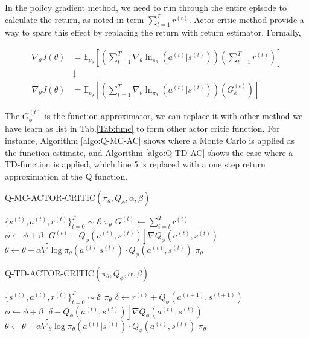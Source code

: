 \documentclass[11pt]{article}
\begin{document}
In the policy gradient method, we need to run through the entire episode to calculate the return, as noted in term $\sum_{t=1}^{T}r^{(t)}$. Actor critic method provide a way to spare this effect by replacing the return with return estimator. Formally, 

\begin{align*}
    \nabla_\theta  J(\theta)&=\mathbb{E}_{p_\theta} \left[\left(\sum_{t=1}^{T}\nabla_{\theta}\ln_{\pi_ \theta}(a^{(t)}|s^{(t)})\right)\left( \sum_{t=1}^{T}r^{(t)}\right)\right] \\
    &\downarrow \\
    \nabla_\theta  J(\theta)&=\mathbb{E}_{p_\theta} \left[\left(\sum_{t=1}^{T}\nabla_{\theta}\ln_{\pi_ \theta}(a^{(t)}|s^{(t)})\right)\left( G_{\phi}^{(t)}\right)\right] 
\end{align*}

The $G_{\phi}^{(t)}$ is the function approximator, we can replace it with other method we have learn as list in Tab.\ref{Tab:func} to form other actor critic function. For instance, Algorithm \ref{algo:Q-MC-AC} shows where a Monte Carlo is applied as the function estimate, and Algorithm \ref{algo:Q-TD-AC} shows the case where a TD-function is applied, which line 5 is replaced with a one step return approximation of the Q function.


\begin{algorithm}[H]
\caption{Q-MC-ACTOR-CRITIC$( \pi_\theta , Q_\phi , \alpha , \beta)$}
\label{algo:Q-MC-AC}
\begin{algorithmic}[1]
\STATE $\{s^{(t)},a^{(t)},r^{(t)}\}_{t=0}^{T} \sim \mathcal{E}| \pi_\theta $
\STATE $G^{(t)} \leftarrow \sum_{i=t}^{T} r^{(i)}$
\STATE $\phi \leftarrow \phi  +  \beta[ G^{(t)}-Q_\phi(a^{(t)} , s^ {( t )})]\nabla Q_\phi(a^{(t)} , s^{(t)})$
\STATE $\theta \leftarrow \theta + \alpha \nabla \log{\pi_\theta(a^{(t)}|s^{(t)})} \cdot Q_\phi(a^{(t)},s^{(t)}) $
\ENDFOR
\ENDFOR 
\RETURN $\pi_\theta$
\end{algorithmic}
\end{algorithm}


\begin{algorithm}[H]
\caption{Q-TD-ACTOR-CRITIC$( \pi_\theta , Q_\phi, \alpha, \beta)$}
\label{algo:Q-TD-AC}
\begin{algorithmic}[1]
\STATE $ \{s^{(t)},a^{(t)},r^{(t)}\}_{t=0}^T  \sim \mathcal{E}| \pi_\theta $
\STATE $ \delta  \leftarrow  r^{(t)} + Q_\phi( a^{(t+1)}, s^{(t+1)}) $
\STATE $ \phi  \leftarrow \phi + \beta[\delta-Q_\phi(a^{(t)},s^{(t)})]\nabla  Q_\phi(a^{(t)} , s^{(t)}) $
\STATE $ \theta \leftarrow \theta + \alpha \nabla_{ \theta } \log{\pi_\theta(a^{(t)}|s^{(t)})}  \cdot  Q_\phi(a^{(t)} , s^{(t)}) $
\ENDFOR
\ENDFOR 
\RETURN $ \pi_\theta$
\end{algorithmic}
\end{algorithm}
\end{document}
